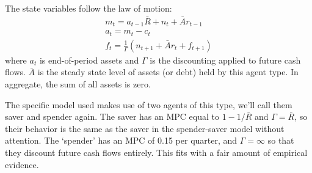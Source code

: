 \documentclass[AER]{AEA}
\begin{document}
The state variables follow the law of motion:
\begin{align}
	m_t = a_{t-1}\bar{R} + n_t + \bar{A} r_{t-1}\\
	a_t = m_t - c_t \\
	f_t = \frac{1}{\Gamma} (n_{t+1} +\bar{A}r_t + f_{t+1} ) 
\end{align}
where $a_t$ is end-of-period assets and $\Gamma$ is the discounting applied to future cash flows. $\bar{A}$ is the steady state level of assets (or debt) held by this agent type. In aggregate, the sum of all assets is zero.

The specific model used makes use of two agents of this type, we'll call them saver and spender again. The saver has an MPC equal to $1-1/\bar{R}$ and $\Gamma=\bar{R}$, so their behavior is the same as the saver in the spender-saver model without attention. The `spender' has an MPC of 0.15 per quarter, and $\Gamma=\infty$ so that they discount future cash flows entirely. This fits with a fair amount of empirical evidence.
\end{document}
